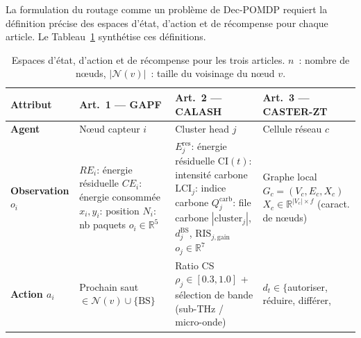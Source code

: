 La formulation du routage comme un problème de Dec-POMDP requiert la définition précise des espaces d'état, d'action et de récompense pour chaque article. Le Tableau~\ref{tab:spaces} synthétise ces définitions.

\begin{table}[htbp]
\centering
\footnotesize
\setlength{\tabcolsep}{4pt}
\renewcommand{\arraystretch}{1.5}
\caption{Espaces d'état, d'action et de récompense pour les trois articles. $n$~: nombre de n\oe{}uds, $|\mathcal{N}(v)|$~: taille du voisinage du n\oe{}ud $v$.}
\label{tab:spaces}
\begin{tabular}{p{1.7cm}p{3.8cm}p{3.8cm}p{3.8cm}}
\toprule
\textbf{Attribut} & \textbf{Art.~1 --- GAPF} & \textbf{Art.~2 --- CALASH} & \textbf{Art.~3 --- CASTER-ZT} \\
\midrule
\textbf{Agent} &
  N\oe{}ud capteur $i$ &
  Cluster head $j$ &
  Cellule réseau $c$ \\
\midrule
\textbf{Observation $o_i$} &
  $RE_i$: énergie résiduelle\newline
  $CE_i$: énergie consommée\newline
  $x_i,y_i$: position\newline
  $N_i$: nb paquets\newline
  $o_i \in \mathbb{R}^{5}$ &
  $E_j^{\text{res}}$: énergie résiduelle\newline
  $\text{CI}(t)$: intensité carbone\newline
  $\text{LCI}_j$: indice carbone\newline
  $Q_j^{\text{carb}}$: file carbone\newline
  $|\text{cluster}_j|$, $d_j^{\text{BS}}$, $\text{RIS}_{j,\text{gain}}$\newline
  $o_j \in \mathbb{R}^{7}$ &
  Graphe local\newline
  $G_c = (V_c, E_c, X_c)$\newline
  $X_c \in \mathbb{R}^{|V_c| \times f}$\newline
  (caract. de n\oe{}uds) \\
\midrule
\textbf{Action $a_i$} &
  Prochain saut\newline
  $\in \mathcal{N}(v) \cup \{\text{BS}\}$ &
  Ratio CS $\rho_j \in [0.3, 1.0]$\newline
  + sélection de bande\newline
  (sub-THz / micro-onde) &
  $d_t \in \{$autoriser,\newline
  \hphantom{$d_t \in \{$}réduire,\newline
  \hphantom{$d_t \in \{$}différer,\newline

\end{tabular}
\end{table}

